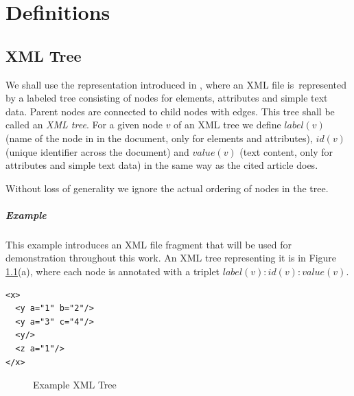 \chapter{Definitions}
\label{chapter-definitions}

\section{XML Tree}

We shall use the representation introduced in \cite{fidax}, where an XML file is~represented by a labeled tree consisting of nodes for elements, attributes and simple text data. Parent nodes are connected to child nodes with edges. This tree shall be called an \textit{XML tree}. For a given node $v$ of an XML tree we define $label(v)$ (name of the node in in the document, only for elements and attributes), $id(v)$ (unique identifier across the document) and $value(v)$ (text content, only for attributes and simple text data) in the same way as the cited article does.

Without loss of generality we ignore the actual ordering of nodes in the tree.

\paragraph{Example}

This example introduces an XML file fragment that will be used for demonstration throughout this work. An XML tree representing it is in Figure \ref{image-definitions-example-xml-tree}(a), where each node is annotated with a triplet $label(v) : id(v) : value(v)$.

\begin{verbatim}
<x>
  <y a="1" b="2"/>
  <y a="3" c="4"/>
  <y/>
  <z a="1"/>
</x>
\end{verbatim}

\begin{figure}
  \caption{Example XML Tree}
  \label{image-definitions-example-xml-tree} 
  \centering
\end{figure}


